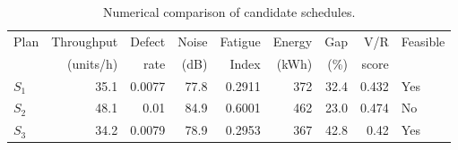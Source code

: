 \begin{table}[htbp]
\centering
\caption{Numerical comparison of candidate schedules.}
\label{tab:numerical-sim}
\small
\begin{tabular}{@{}lrrrrrrrl@{}}
\toprule
Plan & Throughput & Defect & Noise & Fatigue & Energy & Gap & V/R & Feasible \\
     & (units/h)  & rate   & (dB)  & Index   & (kWh)  & (\%) & score &         \\
\midrule
$S_{1}$ & 35.1 & 0.0077 & 77.8 & 0.2911 & 372 & 32.4 & 0.432 & Yes \\
$S_{2}$ & 48.1 & 0.01 & 84.9 & 0.6001 & 462 & 23.0 & 0.474 & No \\
$S_{3}$ & 34.2 & 0.0079 & 78.9 & 0.2953 & 367 & 42.8 & 0.42 & Yes \\
\bottomrule
\end{tabular}
\end{table}
